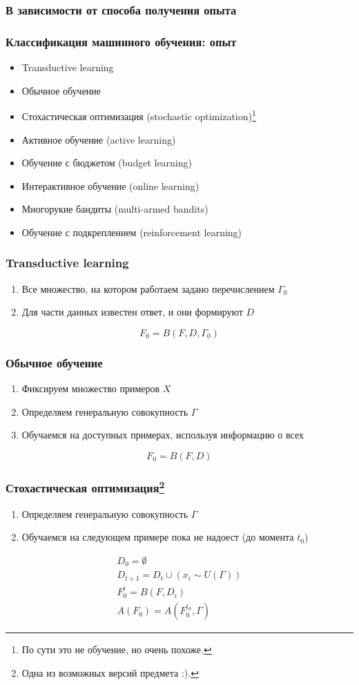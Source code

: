 \documentclass[14pt, fleqn, xcolor={dvipsnames, table}]{beamer}
\begin{document}
\subsubsection{В зависимости от способа получения опыта}
\begin{frame}
\frametitle{Классификация машинного обучения: опыт}
\begin{itemize}
	\item Transductive learning
	\item Обычное обучение
	\item Стохастическая оптимизация (stochastic optimization)\footnote{По сути это не обучение, но очень похоже.}
	\item Активное обучение (active learning)
	\item Обучение с бюджетом (budget learning) 
	\item Интерактивное обучение (online learning)
	\item Многорукие бандиты (multi-armed bandits)
	\item Обучение с подкреплением (reinforcement learning) 
\end{itemize}
\end{frame}

\begin{frame}
\frametitle{Transductive learning}
\begin{enumerate}
	\item Все множество, на котором работаем задано перечислением $\Gamma_0$
	\item Для части данных известен ответ, и они формируют $D$
\end{enumerate}
$$
F_0=B(F, D, \Gamma_0)
$$
\end{frame}

\begin{frame}
\frametitle{Обычное обучение}
\begin{enumerate}
	\item Фиксируем множество примеров $X$
	\item Определяем генеральную совокупность $\Gamma$
	\item Обучаемся на доступных примерах, используя информацию о всех
\end{enumerate}
$$
F_0 = B(F, D)
$$
\end{frame}

\begin{frame}
\frametitle{Стохастическая оптимизация\footnote{Одна из возможных версий предмета :).}}
\begin{enumerate}
	\item Определяем генеральную совокупность $\Gamma$
	\item Обучаемся на следующем примере пока не надоест (до момента $t_0$)
\end{enumerate}
$$\begin{array}{l}
D_0 = \emptyset \\
D_{t+1} = D_{t} \cup \left(x_i \sim U(\Gamma)\right) \\
F_0^t=B(F, D_i) \\
A(F_0) = A(F_0^{t_0}, \Gamma)
\end{array}$$
\end{frame}
\end{document}

